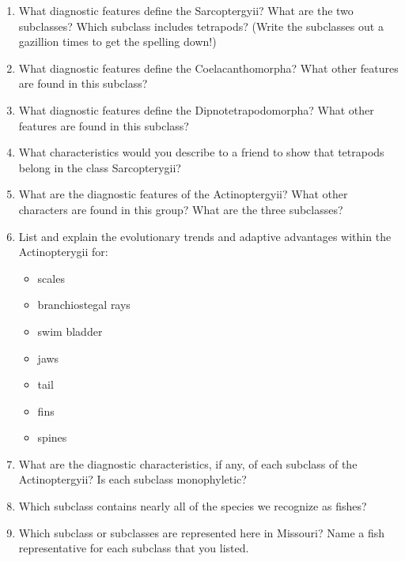 \documentclass[letterpaper]{tufte-handout}
\begin{document}
\begin{enumerate}
	\item What diagnostic features define the Sarcoptergyii?  What are the two subclasses?  Which subclass includes tetrapods?  (Write the subclasses out a gazillion times to get the spelling down!)

	\item What diagnostic features define the Coelacanthomorpha?  What other features are found in this subclass?

	\item What diagnostic features define the Dipnotetrapodomorpha?  What other features are found in this subclass?

	\item What characteristics would you describe to a friend to show that tetrapods belong in the class Sarcopterygii?

	\item What are the diagnostic features of the Actinoptergyii?  What other characters are found in this group?  What are the three subclasses?  

	\item List and explain the evolutionary trends and adaptive advantages within the Actinopterygii for:
	\begin{itemize}
		\item scales
		\item branchiostegal rays
		\item swim bladder
		\item jaws
		\item tail
		\item fins
		\item spines
	\end{itemize}

	\item What are the diagnostic characteristics, if any, of each subclass of the Actinoptergyii?  Is each subclass monophyletic? 

	\item Which subclass contains nearly all of the species we recognize as fishes?

	\item Which subclass or subclasses are represented here in Missouri? Name a fish representative for each subclass that you listed.

\end{enumerate}
\end{document}
